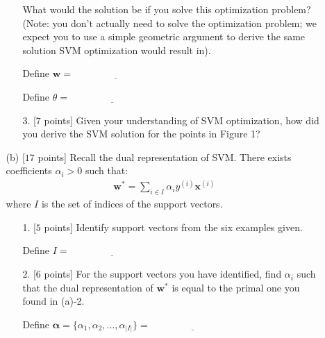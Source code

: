 \begin{enumerate}
\begin{enumerate}
\begin{enumerate}
What would the solution be if you solve this optimization problem? (Note: you don't actually need to solve the optimization problem; we expect you to use a simple geometric argument to derive the same solution SVM optimization would result in).

\vspace{.13in}
Define $\mathbf{w}=$ $\underline{\qquad\qquad\qquad\qquad}$

\vspace{.13in}
Define $\theta =$ $\underline{\qquad\qquad\qquad\qquad}$
\vspace{.13in}

\item[3.][$7$ points] Given your understanding of SVM optimization, how did you derive the SVM solution for the points in Figure 1?

\vspace{.60in}

\end{enumerate}

\item[(b)][$17$ points]
Recall the dual representation of SVM. There exists coefficients $\alpha_{i} > 0$ such that:
\begin{eqnarray}
\mathbf{w}^{*} = \sum_{i\in I}{\alpha_{i}y^{(i)}\mathbf{x}^{(i)}}
\end{eqnarray}
where $I$ is the set of indices of the support vectors.
\begin{enumerate}

\item[1.][$5$ points] Identify support vectors from the six examples given.

\vspace{.2in}
Define $I =$ $\underline{\qquad\qquad\qquad\qquad}$
\vspace{.2in}


\item[2.][$6$ points] For the support vectors you have identified, find $\alpha_i$ such that the dual representation of $\mathbf{w}^{*}$ is equal to the primal one you found in (a)-2.

 \vspace{.2in}
Define $\mathbf{\alpha} = \{\alpha_1, \alpha_2, ..., \alpha_{|I|}\} = $ $\underline{\qquad\qquad\qquad\qquad}$
\vspace{.2in}



\end{enumerate}
\end{enumerate}
\end{enumerate}
